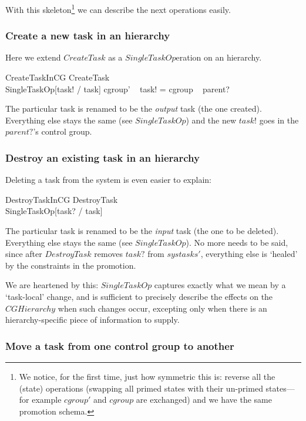 \documentclass[a4paper,twoside,12pt]{article}
\begin{document}
With this skeleton\footnote{We notice, for the first time, just how symmetric this is: 
reverse all the (state) operations (swapping all primed states with their un-primed states---for 
example $cgroup'$ and $cgroup$ are exchanged) and we have the same promotion schema.}
we can describe the next operations easily.

\subsubsection{Create a new task in an hierarchy}

Here we extend $CreateTask$ as a $SingleTaskOp$eration on an hierarchy.

\begin{schema}{CreateTaskInCG}
CreateTask \\
SingleTaskOp[task! / task]
\where
cgroup' ~ task! = cgroup ~ parent?
\end{schema}
The particular task is renamed to be the \emph{output} task (the one created). 
Everything else stays the same (see $SingleTaskOp$) and the new $task!$ goes in the $parent?$'s control group.

\subsubsection{Destroy an existing task in an hierarchy}

Deleting a task from the system is even easier to explain:

\begin{schema}{DestroyTaskInCG}
DestroyTask \\
SingleTaskOp[task? / task]
\end{schema}
The particular task is renamed to be the \emph{input} task (the one to be deleted).
Everything else stays the same (see $SingleTaskOp$). 
No more needs to be said, since after $DestroyTask$ removes $task?$ from $systasks'$, 
everything else is `healed' by the constraints in the promotion.

We are heartened by this: $SingleTaskOp$ captures exactly what we mean by a `task-local' change,
and is sufficient to precisely describe the effects on the $CGHierarchy$ when such changes occur, excepting only 
when there is
an hierarchy-specific piece of information to supply.

\subsubsection{Move a task from one control group to another}
\end{document}
